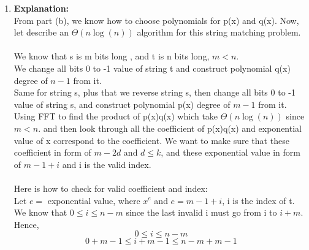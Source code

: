 \documentclass[11pt]{article}
\newenvironment{qparts}{\begin{enumerate}[{(}a{)}]}{\end{enumerate}}
\begin{document}
\begin{qparts}
\\
Therefore, Here how to choose polynomials p(x) and q(x).\\
\textbf{change all bits 0 to -1 in string t and construct a polynomials q(x) degree of $n - 1$ from it}. Example: t = 1 1 0 1 would be $q(x) = 1 + x -x^2 + x^3$\\
\\
\textbf{Reverse bit string s and change all bits 0 to -1 and construct a polynomials p(x) degree $m - 1$ from it}. Example: s = 1 1 0 , $s\prime$ = reverse s = 0 1 1 , and $p(x) = -1 + x + x^2$\\
\\
Using FFT to do p(x)q(x), and then look through all the coefficient of p(x)q(x) and exponential value of x correspond to the coefficient. We want to make sure that these coefficient in form of $m-2d$ and $d \leqslant k$, and these exponential value in form of $m-1 + i$ and i is the valid index. 
\item
\noindent
\textbf{Explanation:}\\
From part (b), we know how to choose polynomials for p(x) and q(x). Now, let describe an $\Theta(n\log(n))$ algorithm for this string matching problem.\\
\\
We know that s is m bits long , and t is n bits long, $m< n$.\\
We change all bits 0 to -1 value of string t and construct polynomial q(x) degree of $n-1$ from it.\\
Same for string s, plus that we reverse string s, then change all bits 0 to -1 value of string s, and construct polynomial p(x) degree of $m-1 $ from it.\\
Using FFT to find the product of p(x)q(x) which take $\Theta(n\log(n))$ since $m < n$.  and then look through all the coefficient of p(x)q(x) and exponential value of x correspond to the coefficient. We want to make sure that these coefficient in form of $m-2d$ and $d \leqslant k$, and these exponential value in form of $m-1 + i$ and i is the valid index.\\
\\
Here is how to check for valid coefficient and index:\\
Let $e = $ exponential value, where $x^e$ and $e =m-1+i$, i is the index of t.\\
We know that $0 \leqslant i \leqslant n-m$ since the last invalid i must go from i to $i + m$. Hence,
$$0 \leqslant i \leqslant n-m$$
$$0 + m-1 \leqslant i + m - 1 \leqslant n-m + m -1$$

\end{qparts}
\end{document}
